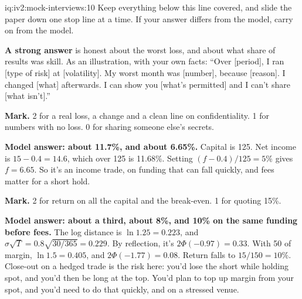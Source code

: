 \begin{solution}{iq:iv2:mock-interviews:10}
Keep everything below this line covered, and slide the paper down one stop line at a time. If your answer differs from the model, carry on from the model.

\ivstop
\textbf{A strong answer} is honest about the worst loss, and about what share of results was skill. As an illustration, with your own facts: ``Over [period], I ran [type of risk] at [volatility]. My worst month was [number], because [reason]. I changed [what] afterwards. I can show you [what's permitted] and I can't share [what isn't].''

\textbf{Mark.} 2 for a real loss, a change and a clean line on confidentiality. 1 for numbers with no loss. 0 for sharing someone else's secrets.

\ivstop
\textbf{Model answer: about 11.7\%, and about 6.65\%.} Capital is 125. Net income is $15 - 0.4 = 14.6$, which over 125 is 11.68\%. Setting $(f - 0.4)/125 = 5\%$ gives $f = 6.65$. So it's an income trade, on funding that can fall quickly, and fees matter for a short hold.

\textbf{Mark.} 2 for return on all the capital and the break-even. 1 for quoting 15\%.

\ivstop
\textbf{Model answer: about a third, about 8\%, and 10\% on the same funding before fees.} The log distance is $\ln 1.25 = 0.223$, and $\sigma\sqrt{T} = 0.8\sqrt{30/365} = 0.229$. By reflection, it's $2\Phi(-0.97) = 0.33$. With 50 of margin, $\ln 1.5 = 0.405$, and $2\Phi(-1.77) = 0.08$. Return falls to $15/150 = 10\%$. Close-out on a hedged trade is the risk here: you'd lose the short while holding spot, and you'd then be long at the top. You'd plan to top up margin from your spot, and you'd need to do that quickly, and on a stressed venue.


\end{solution}
